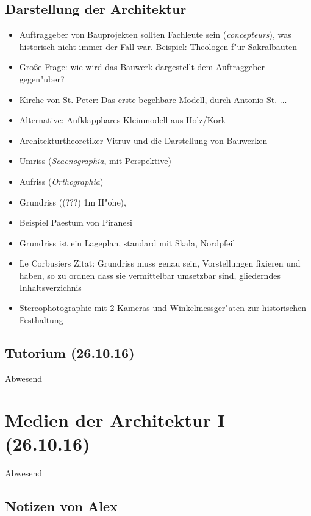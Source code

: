\documentclass[]{scrartcl}
\begin{document}
\subsection{Darstellung der Architektur}

\begin{itemize}
    \item Auftraggeber von Bauprojekten sollten Fachleute sein (\emph{concepteurs}), was historisch nicht immer der Fall war. Beispiel: Theologen f"ur Sakralbauten
    \item Gro\ss e Frage: wie wird das Bauwerk dargestellt dem Auftraggeber gegen"uber?
    \item Kirche von St. Peter: Das erste begehbare Modell, durch Antonio St. ... 
    \item Alternative: Aufklappbares Kleinmodell aus Holz/Kork
    \item Architekturtheoretiker Vitruv und die Darstellung von Bauwerken
    \item Umriss (\emph{Scaenographia}, mit Perspektive)
    \item Aufriss (\emph{Orthographia})
    \item Grundriss ({\color{red}(???)} 1m H"ohe),
    \item Beispiel Paestum von Piranesi
    \item Grundriss ist ein Lageplan, standard mit Skala, Nordpfeil
    \item Le Corbusiers Zitat: Grundriss muss genau sein, Vorstellungen fixieren und haben, so zu ordnen dass sie vermittelbar umsetzbar sind, gliederndes Inhaltsverzichnis
    \item Stereophotographie mit 2 Kameras und Winkelmessger"aten zur historischen Festhaltung 
\end{itemize}

\subsection{Tutorium  (26.10.16)}
Abwesend

\section{Medien der Architektur I\\(26.10.16)}

Abwesend

\subsection{Notizen von Alex}
\end{document}
